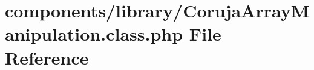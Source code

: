 \hypertarget{_coruja_array_manipulation_8class_8php}{
\section{components/library/CorujaArrayManipulation.class.php File Reference}
\label{_coruja_array_manipulation_8class_8php}
}
